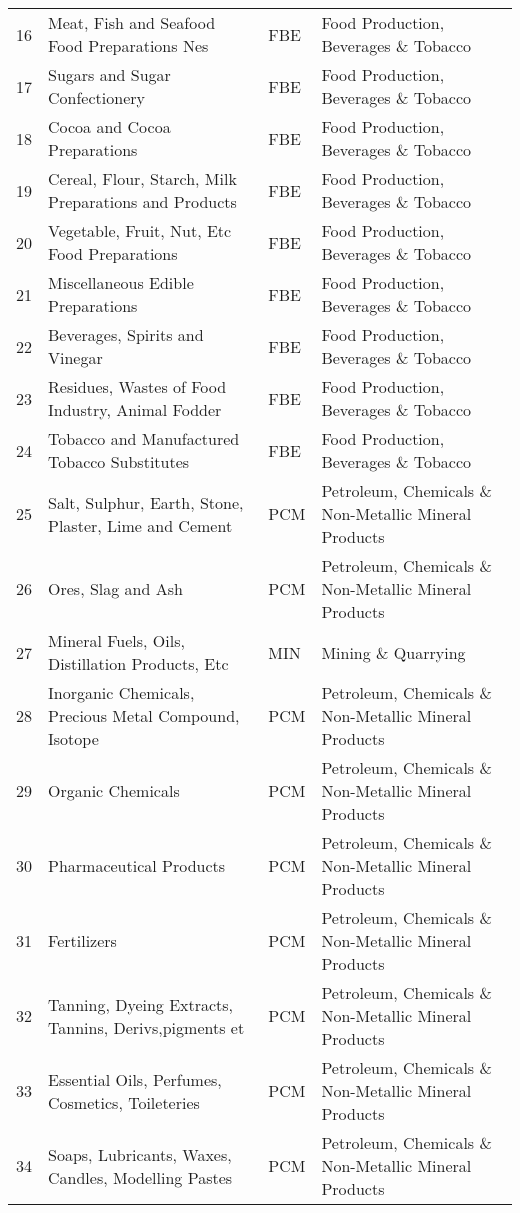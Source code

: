 \documentclass[a4paper]{article}
\begin{document}
\begin{table}[ht]
{\begin{tabular}{rlll}
  16 & Meat, Fish and Seafood Food Preparations Nes & FBE & Food Production, Beverages \& Tobacco \\ 
  17 & Sugars and Sugar Confectionery & FBE & Food Production, Beverages \& Tobacco \\ 
  18 & Cocoa and Cocoa Preparations & FBE & Food Production, Beverages \& Tobacco \\ 
  19 & Cereal, Flour, Starch, Milk Preparations and Products & FBE & Food Production, Beverages \& Tobacco \\ 
  20 & Vegetable, Fruit, Nut, Etc Food Preparations & FBE & Food Production, Beverages \& Tobacco \\ 
  21 & Miscellaneous Edible Preparations & FBE & Food Production, Beverages \& Tobacco \\ 
  22 & Beverages, Spirits and Vinegar & FBE & Food Production, Beverages \& Tobacco \\ 
  23 & Residues, Wastes of Food Industry, Animal Fodder & FBE & Food Production, Beverages \& Tobacco \\ 
  24 & Tobacco and Manufactured Tobacco Substitutes & FBE & Food Production, Beverages \& Tobacco \\ 
  25 & Salt, Sulphur, Earth, Stone, Plaster, Lime and Cement & PCM & Petroleum, Chemicals \& Non-Metallic Mineral Products \\ 
  26 & Ores, Slag and Ash & PCM & Petroleum, Chemicals \& Non-Metallic Mineral Products \\ 
  27 & Mineral Fuels, Oils, Distillation Products, Etc & MIN & Mining \& Quarrying \\ 
  28 & Inorganic Chemicals, Precious Metal Compound, Isotope & PCM & Petroleum, Chemicals \& Non-Metallic Mineral Products \\ 
  29 & Organic Chemicals & PCM & Petroleum, Chemicals \& Non-Metallic Mineral Products \\ 
  30 & Pharmaceutical Products & PCM & Petroleum, Chemicals \& Non-Metallic Mineral Products \\ 
  31 & Fertilizers & PCM & Petroleum, Chemicals \& Non-Metallic Mineral Products \\ 
  32 & Tanning, Dyeing Extracts, Tannins, Derivs,pigments et & PCM & Petroleum, Chemicals \& Non-Metallic Mineral Products \\ 
  33 & Essential Oils, Perfumes, Cosmetics, Toileteries & PCM & Petroleum, Chemicals \& Non-Metallic Mineral Products \\ 
  34 & Soaps, Lubricants, Waxes, Candles, Modelling Pastes & PCM & Petroleum, Chemicals \& Non-Metallic Mineral Products \\ 

\end{tabular}}
\end{table}
\end{document}
